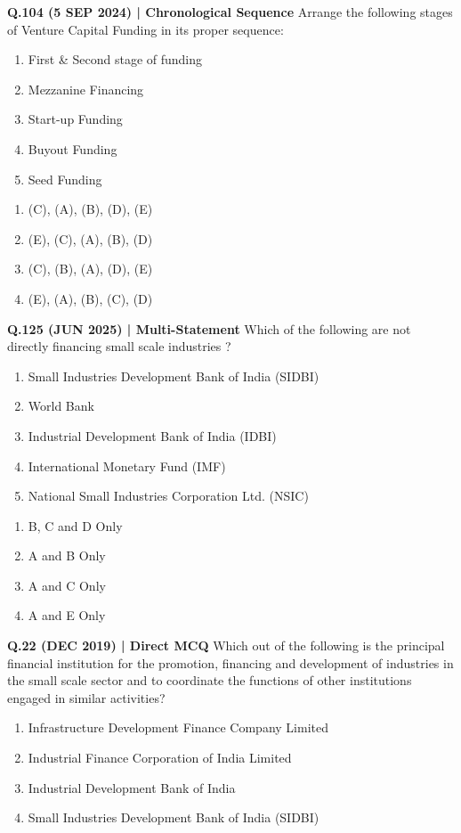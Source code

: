 \documentclass{article}
\begin{document}
\textbf{Q.104 (5 SEP 2024) | Chronological Sequence}
Arrange the following stages of Venture Capital Funding in its proper sequence:
\begin{enumerate}[label=\Alph*.]
    \item First \& Second stage of funding
    \item Mezzanine Financing
    \item Start-up Funding
    \item Buyout Funding
    \item Seed Funding
\end{enumerate}
\begin{enumerate}[label=(\arabic*)]
    \item (C), (A), (B), (D), (E)
    \item (E), (C), (A), (B), (D)
    \item (C), (B), (A), (D), (E)
    \item (E), (A), (B), (C), (D)
\end{enumerate}

\textbf{Q.125 (JUN 2025) | Multi-Statement}
Which of the following are not directly financing small scale industries ?
\begin{enumerate}[label=\Alph*.]
    \item Small Industries Development Bank of India (SIDBI)
    \item World Bank
    \item Industrial Development Bank of India (IDBI)
    \item International Monetary Fund (IMF)
    \item National Small Industries Corporation Ltd. (NSIC)
\end{enumerate}
\begin{enumerate}[label=(\arabic*)]
    \item B, C and D Only
    \item A and B Only
    \item A and C Only
    \item A and E Only
\end{enumerate}

\textbf{Q.22 (DEC 2019) | Direct MCQ}
Which out of the following is the principal financial institution for the promotion, financing and development of industries in the small scale sector and to coordinate the functions of other institutions engaged in similar activities?
\begin{enumerate}[label=(\arabic*)]
    \item Infrastructure Development Finance Company Limited
    \item Industrial Finance Corporation of India Limited
    \item Industrial Development Bank of India
    \item Small Industries Development Bank of India (SIDBI)
\end{enumerate}
\end{document}
